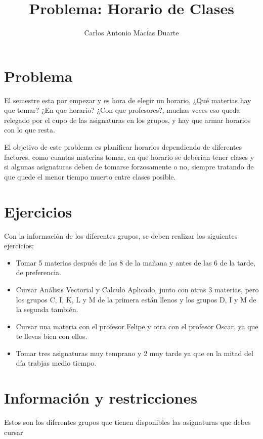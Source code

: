 \documentclass[10pt,letterpaper,twoside,openright]{article}
\author{Carlos Antonio Macías Duarte}
\title{Problema: Horario de Clases}
\begin{document}
	\maketitle

	\section{Problema}
	
	El semestre esta por empezar y es hora de elegir un horario, ¿Qué materias hay que tomar? ¿En que horario? ¿Con que profesores?, muchas veces eso queda relegado por el cupo de las asignaturas en los grupos, y hay que armar horarios con lo que resta.
	
	El objetivo de este problema es planificar horarios dependiendo de diferentes factores, como cuantas materias tomar, en que horario se deberían tener clases y si algunas asignaturas deben de tomarse forzosamente o no, siempre tratando de que quede el menor tiempo muerto entre clases posible.

	\section{Ejercicios}
	
	Con la información de los diferentes grupos, se deben realizar los siguientes ejercicios:
	
	\begin{itemize}
		\item Tomar 5 materias después de las 8 de la mañana y antes de las 6 de la tarde, de preferencia.
		\item Cursar Análisis Vectorial y Calculo Aplicado, junto con otras 3 materias, pero los grupos C, I, K, L y M de la primera están llenos y los grupos D, I y M de la segunda también. 
		\item Cursar una materia con el profesor Felipe y otra con el profesor Oscar, ya que te llevas bien con ellos.
		\item Tomar tres asignaturas muy temprano y 2 muy tarde ya que en la mitad del día trabjas medio tiempo.
	\end{itemize}

	\section{Información y restricciones}

	Estos son los diferentes grupos que tienen disponibles las asignaturas que debes cursar
\end{document}
